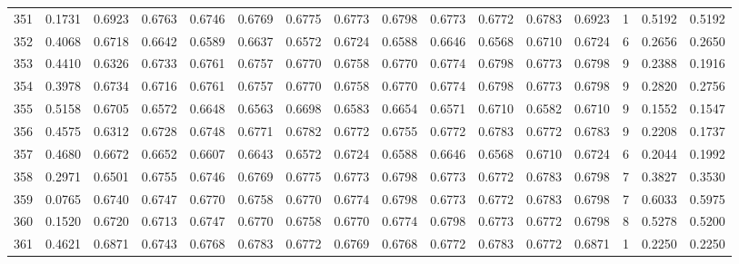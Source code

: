 \begin{tabular}{lrrrrrrrrrrrrrrr}
351 &      0.1731 &  0.6923 &  0.6763 &  0.6746 &  0.6769 &  0.6775 &  0.6773 &  0.6798 &  0.6773 &  0.6772 &   0.6783 &     0.6923 &      1 &                    0.5192 &                     0.5192 \\
352 &      0.4068 &  0.6718 &  0.6642 &  0.6589 &  0.6637 &  0.6572 &  0.6724 &  0.6588 &  0.6646 &  0.6568 &   0.6710 &     0.6724 &      6 &                    0.2656 &                     0.2650 \\
353 &      0.4410 &  0.6326 &  0.6733 &  0.6761 &  0.6757 &  0.6770 &  0.6758 &  0.6770 &  0.6774 &  0.6798 &   0.6773 &     0.6798 &      9 &                    0.2388 &                     0.1916 \\
354 &      0.3978 &  0.6734 &  0.6716 &  0.6761 &  0.6757 &  0.6770 &  0.6758 &  0.6770 &  0.6774 &  0.6798 &   0.6773 &     0.6798 &      9 &                    0.2820 &                     0.2756 \\
355 &      0.5158 &  0.6705 &  0.6572 &  0.6648 &  0.6563 &  0.6698 &  0.6583 &  0.6654 &  0.6571 &  0.6710 &   0.6582 &     0.6710 &      9 &                    0.1552 &                     0.1547 \\
356 &      0.4575 &  0.6312 &  0.6728 &  0.6748 &  0.6771 &  0.6782 &  0.6772 &  0.6755 &  0.6772 &  0.6783 &   0.6772 &     0.6783 &      9 &                    0.2208 &                     0.1737 \\
357 &      0.4680 &  0.6672 &  0.6652 &  0.6607 &  0.6643 &  0.6572 &  0.6724 &  0.6588 &  0.6646 &  0.6568 &   0.6710 &     0.6724 &      6 &                    0.2044 &                     0.1992 \\
358 &      0.2971 &  0.6501 &  0.6755 &  0.6746 &  0.6769 &  0.6775 &  0.6773 &  0.6798 &  0.6773 &  0.6772 &   0.6783 &     0.6798 &      7 &                    0.3827 &                     0.3530 \\
359 &      0.0765 &  0.6740 &  0.6747 &  0.6770 &  0.6758 &  0.6770 &  0.6774 &  0.6798 &  0.6773 &  0.6772 &   0.6783 &     0.6798 &      7 &                    0.6033 &                     0.5975 \\
360 &      0.1520 &  0.6720 &  0.6713 &  0.6747 &  0.6770 &  0.6758 &  0.6770 &  0.6774 &  0.6798 &  0.6773 &   0.6772 &     0.6798 &      8 &                    0.5278 &                     0.5200 \\
361 &      0.4621 &  0.6871 &  0.6743 &  0.6768 &  0.6783 &  0.6772 &  0.6769 &  0.6768 &  0.6772 &  0.6783 &   0.6772 &     0.6871 &      1 &                    0.2250 &                     0.2250 \\

\end{tabular}

